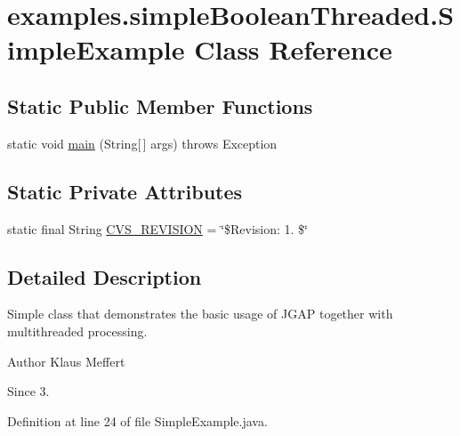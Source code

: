 \hypertarget{classexamples_1_1simple_boolean_threaded_1_1_simple_example}{\section{examples.\-simple\-Boolean\-Threaded.\-Simple\-Example Class Reference}
\label{classexamples_1_1simple_boolean_threaded_1_1_simple_example}
}
\subsection*{Static Public Member Functions}
\begin{DoxyCompactItemize}
\item 
static void \hyperlink{classexamples_1_1simple_boolean_threaded_1_1_simple_example_ab55245566b467d39fbc8098617ba5cbe}{main} (String\mbox{[}$\,$\mbox{]} args)  throws Exception 
\end{DoxyCompactItemize}
\subsection*{Static Private Attributes}
\begin{DoxyCompactItemize}
\item 
static final String \hyperlink{classexamples_1_1simple_boolean_threaded_1_1_simple_example_a93ef8938c86ff16e7dddb13b7e861b86}{C\-V\-S\-\_\-\-R\-E\-V\-I\-S\-I\-O\-N} = \char`\"{}\$Revision\-: 1. \$\char`\"{}
\end{DoxyCompactItemize}


\subsection{Detailed Description}
Simple class that demonstrates the basic usage of J\-G\-A\-P together with multithreaded processing.

\begin{DoxyAuthor}{Author}
Klaus Meffert 
\end{DoxyAuthor}
\begin{DoxySince}{Since}
3. 
\end{DoxySince}


Definition at line 24 of file Simple\-Example.\-java.



